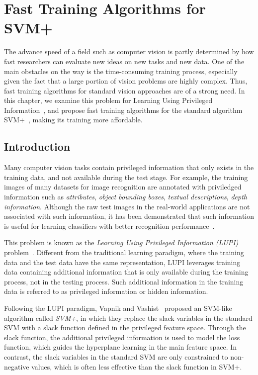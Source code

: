 \chapter{Fast Training Algorithms for SVM+}
\label{ch:svmplus}


The advance speed of a field such as computer vision is partly determined by how fast researchers can evaluate new ideas on new tasks and new data. One of the main obstacles on the way is the time-consuming training process, especially given the fact that a large portion of vision problems are highly complex.  Thus, fast training algorithms for standard vision approaches are of a strong need.  In this chapter, we examine this problem for Learning Using Privileged Information~\citep{SVMplus_vapnik}, and propose fast training algorithms for the standard algorithm SVM+~\citep{SVMplus_vapnik}, making its training more affordable.  

\section{Introduction}  
Many computer vision tasks contain privileged information that only
exists in the training data, and not available during the test
stage. For example, the training images of many datasets for image
recognition are annotated with priviledged information such as
\emph{attributes}, \emph{object bounding boxes}, \emph{textual
  descriptions}, \emph{depth information}.  Although the raw test
images in the real-world applications are not associated with such
information, it has been demonstrated that such information is
useful for learning classifiers with better recognition
performance~\citep{Feyereisl2015,Lampert2013,RankTransfer,SVMplus_vapnik,Wang2015,HuaGang2014}.

This problem is known as the \emph{Learning Using Privileged
  Information (LUPI)} problem~\citep{SVMplus_vapnik}. Different from
the traditional learning paradigm, where the training data and the
test data have the same representation, LUPI leverages training data
containing additional information that is only available during the
training process, not in the testing process. Such additional
information in the training data is referred to as privileged
information or hidden information.

Following the LUPI paradigm, Vapnik and Vashist~\citep{SVMplus_vapnik}
proposed an SVM-like algorithm called \emph{SVM+}, in which they
replace the slack variables in the standard SVM with a slack function
defined in the privileged feature space. Through the slack function,
the additional privileged information is used to model the loss
function, which guides the hyperplane learning in the main feature
space. In contrast, the slack variables in the standard SVM are only
constrained to non-negative values, which is often less effective than
the slack function in SVM+.

